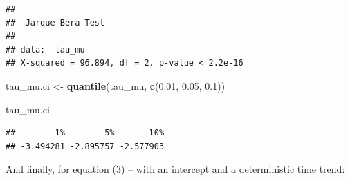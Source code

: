 \documentclass[
]{article}
\newenvironment{Shaded}{\begin{snugshade}}{\end{snugshade}}
\newcommand{\CommentTok}[1]{\textcolor[rgb]{0.56,0.35,0.01}{\textit{#1}}}
\newcommand{\FloatTok}[1]{\textcolor[rgb]{0.00,0.00,0.81}{#1}}
\newcommand{\KeywordTok}[1]{\textcolor[rgb]{0.13,0.29,0.53}{\textbf{#1}}}
\newcommand{\NormalTok}[1]{#1}
\newcommand{\StringTok}[1]{\textcolor[rgb]{0.31,0.60,0.02}{#1}}
\begin{document}
\begin{Shaded}
\end{Shaded}

\begin{verbatim}
## 
##  Jarque Bera Test
## 
## data:  tau_mu
## X-squared = 96.894, df = 2, p-value < 2.2e-16
\end{verbatim}

\begin{Shaded}
\begin{Highlighting}[]
\NormalTok{tau_mu.ci <-}\StringTok{ }\KeywordTok{quantile}\NormalTok{(tau_mu, }\KeywordTok{c}\NormalTok{(}\FloatTok{0.01}\NormalTok{, }\FloatTok{0.05}\NormalTok{, }\FloatTok{0.1}\NormalTok{))}

\NormalTok{tau_mu.ci}
\end{Highlighting}
\end{Shaded}

\begin{verbatim}
##        1%        5%       10% 
## -3.494281 -2.895757 -2.577903
\end{verbatim}

And finally, for equation (3) -- with an intercept and a deterministic
time trend:
\end{document}
